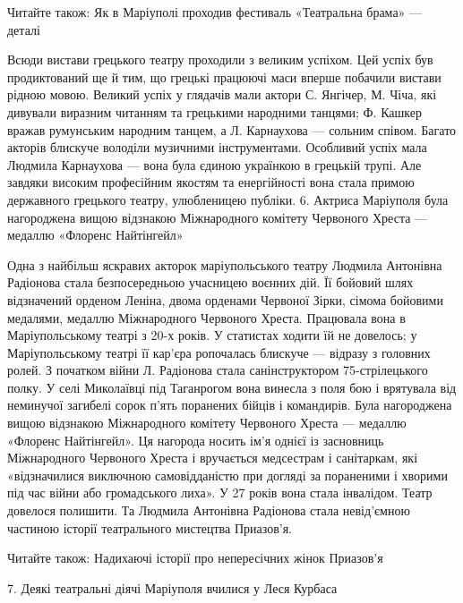 Читайте також: Як в Маріуполі проходив фестиваль «Театральна брама» — деталі

Всюди вистави грецького театру проходили з великим успіхом. Цей успіх був
продиктований ще й тим, що грецькі працюючі маси вперше побачили вистави рідною
мовою. Великий успіх у глядачів мали актори С. Янгічер, М. Чіча, які дивували
виразним читанням та грецькими народними танцями; Ф. Кашкер вражав румунським
народним танцем, а Л. Карнаухова — сольним співом. Багато акторів блискуче
володіли музичними інструментами. Особливий успіх мала Людмила Карнаухова —
вона була єдиною українкою в грецькій трупі. Але завдяки високим професійним
якостям та енергійності вона стала примою державного грецького театру,
улюбленицею публіки.  6. Актриса Маріуполя була нагороджена вищою відзнакою
Міжнародного комітету Червоного Хреста — медаллю «Флоренс Найтінгейл»

Одна з найбільш яскравих акторок маріупольського театру Людмила Антонівна
Радіонова стала безпосередньою учасницею воєнних дій. Її бойовий шлях
відзначений орденом Леніна, двома орденами Червоної Зірки, сімома бойовими
медалями, медаллю Міжнародного Червоного Хреста. Працювала вона в
Маріупольському театрі з 20-х років. У статистах ходити їй не довелось; у
Маріупольському театрі її кар'єра ропочалась блискуче — відразу з головних
ролей. З початком війни Л. Радіонова стала санінструктором 75-стрілецького
полку. У селі Миколаївці під Таганрогом вона винесла з поля бою і врятувала від
неминучої загибелі сорок п'ять поранених бійців і командирів. Була нагороджена
вищою відзнакою Міжнародного комітету Червоного Хреста — медаллю «Флоренс
Найтінгейл». Ця нагорода носить ім'я однієї із засновниць Міжнародного
Червоного Хреста і вручається медсестрам і санітаркам, які «відзначилися
виключною самовідданістю при догляді за пораненими і хворими під час війни або
громадського лиха». У 27 років вона стала інвалідом. Театр довелося полишити.
Та Людмила Антонівна Радіонова стала невід'ємною частиною історії театрального
мистецтва Приазов'я.

Читайте також: Надихаючі історії про непересічних жінок Приазов'я

7. Деякі театральні діячі Маріуполя вчилися у Леся Курбаса

